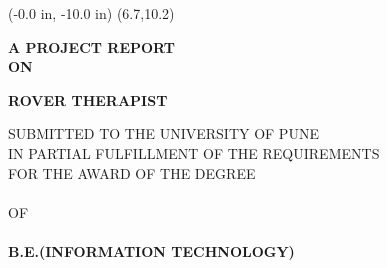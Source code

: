 \documentclass[12pt,a4paper]{article}
\begin{document}
\pagestyle{empty}


\newpage
\pagestyle{empty}
\thisfancyput(-0.0 in, -10.0 in) {\setlength{\unitlength}{1 in}\framebox(6.7,10.2)}
 
\begin{center}
      
      \textbf{A PROJECT REPORT}\\
      \textbf{ON}
      \vspace{0.2 in}
       
			\end{center}
\vspace{0.1 in}
	\begin{center}
		\textbf{ROVER THERAPIST}\\
	\end{center}
     \vspace{0.2 in}
		\begin{center}
	    SUBMITTED TO THE UNIVERSITY OF PUNE \\
	    IN PARTIAL FULFILLMENT OF THE REQUIREMENTS\\
	    FOR THE AWARD OF THE DEGREE \\
	    \\
	    OF\\
	    \\
	    \textbf{B.E.(INFORMATION TECHNOLOGY)}
	\end{center}
	
	\vspace{0.2 in}
	
\end{document}
